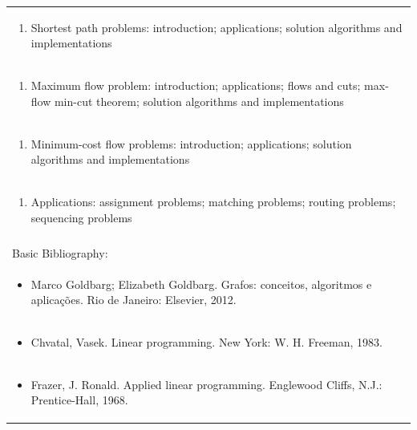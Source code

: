 \documentclass[11pt]{article}
\begin{document}
\begin{center}
\begin{longtable}{|p{4cm}|p{4cm}|p{4cm}|p{4cm}|}
\multicolumn{4}{|p{\dimexpr 16cm + 6\tabcolsep\relax}|}{\begin{enumerate}[start=2]\item Shortest path problems: introduction; applications; solution algorithms and implementations\end{enumerate}}\\
\multicolumn{4}{|p{\dimexpr 16cm + 6\tabcolsep\relax}|}{\begin{enumerate}[start=3]\item Maximum flow problem: introduction; applications; flows and cuts; max-flow min-cut theorem; solution algorithms and implementations\end{enumerate}}\\
\multicolumn{4}{|p{\dimexpr 16cm + 6\tabcolsep\relax}|}{\begin{enumerate}[start=4]\item Minimum-cost flow problems: introduction; applications; solution algorithms and implementations\end{enumerate}}\\
\multicolumn{4}{|p{\dimexpr 16cm + 6\tabcolsep\relax}|}{\begin{enumerate}[start=5]\item Applications: assignment problems; matching problems; routing problems; sequencing problems\end{enumerate}}\\
\multicolumn{4}{|p{\dimexpr 16cm + 6\tabcolsep\relax}|}{}\\
\hline
\multicolumn{4}{|p{16cm}|}{Basic Bibliography:}\\*
\multicolumn{4}{|p{\dimexpr 16cm + 6\tabcolsep\relax}|}{\begin{itemize}\item Marco Goldbarg; Elizabeth Goldbarg. Grafos: conceitos, algoritmos e aplicações. Rio de Janeiro: Elsevier, 2012.\end{itemize}}\\
\multicolumn{4}{|p{\dimexpr 16cm + 6\tabcolsep\relax}|}{\begin{itemize}\item Chvatal, Vasek. Linear programming. New York: W. H. Freeman, 1983.\end{itemize}}\\
\multicolumn{4}{|p{\dimexpr 16cm + 6\tabcolsep\relax}|}{\begin{itemize}\item Frazer, J. Ronald. Applied linear programming. Englewood Cliffs, N.J.: Prentice-Hall, 1968.\end{itemize}}\\

\end{longtable}
\end{center}
\end{document}
